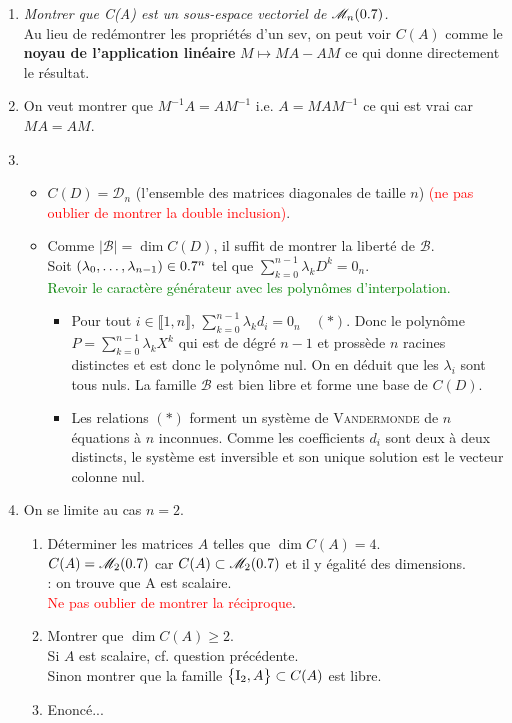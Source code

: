 \begin{enumerate}
    \item \emph{Montrer que C(A) est un sous-espace vectoriel de $\mathscr{M}_n(0.7)$.} \\
    Au lieu de redémontrer les propriétés d'un sev, on peut voir $C(A)$ comme le \textbf{noyau de l'application linéaire} $M \mapsto MA - AM$ ce qui donne directement le résultat. 
    \item On veut montrer que $M^{-1} A = A M^{-1}$ i.e. $A = M A M^{-1}$ ce qui est vrai car $M A = A M$.
    \item
    \begin{itemize}
        \item $C(D) = \mathscr{D}_n$ (l'ensemble des matrices diagonales de taille $n$) \textcolor{red}{(ne pas oublier de montrer la double inclusion)}.
        \item Comme $| \mathscr{B} | = \dim C(D)$, il suffit de montrer la liberté de $\mathscr{B}$. \\
        Soit $(\lambda_0, \dots, \lambda_{n-1}) \in 0.7^n$ tel que $\sum\limits_{k=0}^{n-1} \lambda_k D^k = 0_n$. \\
        \textcolor{green}{Revoir le caractère générateur avec les polynômes d'interpolation.}
        \begin{itemize}
            \item Pour tout $i \in \llbracket 1, n \rrbracket$, $\sum\limits_{k=0}^{n-1} \lambda_k d_i = 0_n \quad (*)$. Donc le polynôme $P = \sum\limits_{k=0}^{n-1} \lambda_k X^k$ qui est de dégré $n-1$ et prossède $n$ racines distinctes et est donc le polynôme nul. On en déduit que les $\lambda_i$ sont tous nuls. La famille $\mathscr{B}$ est bien libre et forme une base de $C(D)$.
            \item Les relations $(*)$ forment un système de \textsc{Vandermonde} de $n$ équations à $n$ inconnues. Comme les coefficients $d_i$ sont deux à deux distincts, le système est inversible et son unique solution est le vecteur colonne nul.
        \end{itemize}
    \end{itemize}
    \item On se limite au cas $n = 2$. 
    \begin{enumerate}
        \item Déterminer les matrices $A$ telles que $\dim C(A) = 4$. \\
        $C(A) = \mathscr{M}_2(0.7)$ car $C(A) \subset \mathscr{M}_2(0.7)$ et il y égalité des dimensions. \\
        : on trouve que A est scalaire. \\
        \textcolor{red}{Ne pas oublier de montrer la réciproque}. 
        \item Montrer que $\dim C(A) \geqslant 2$. \\
        Si $A$ est scalaire, cf. question précédente. \\
        Sinon montrer que la famille $\big\{ \mathrm{I}_2, A \big\} \subset C(A)$ est libre. 
        \item Enoncé... \\
    \end{enumerate}
\end{enumerate}